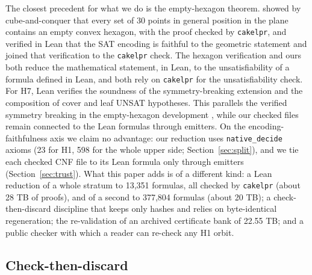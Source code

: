 \documentclass{anvil-paper}
\newcommand{\cakelpr}{\texttt{cake\textunderscore lpr}}
\theoremstyle{definition}
\begin{document}
The closest precedent for what we do is the empty-hexagon theorem. \citet{heule2024hexagon} showed by cube-and-conquer \citep{heule2011cube} that every set of 30 points in general position in the plane contains an empty convex hexagon, with the proof checked by \cakelpr{}, and \citet{subercaseaux2024hexagonlean} verified in Lean that the SAT encoding is faithful to the geometric statement and joined that verification to the \cakelpr{} check. The hexagon verification and ours both reduce the mathematical statement, in Lean, to the unsatisfiability of a formula defined in Lean, and both rely on \cakelpr{} for the unsatisfiability check. For H7, Lean verifies the soundness of the symmetry-breaking extension and the composition of cover and leaf UNSAT hypotheses. This parallels the verified symmetry breaking in the empty-hexagon development \citep{subercaseaux2024hexagonlean}, while our checked files remain connected to the Lean formulas through emitters. On the encoding-faithfulness axis we claim no advantage: our reduction uses \texttt{native\_decide} axioms (23 for H1, 598 for the whole upper side; Section~\ref{sec:split}), and we tie each checked CNF file to its Lean formula only through emitters (Section~\ref{sec:trust}). What this paper adds is of a different kind: a Lean reduction of a whole stratum to 13,351 formulas, all checked by \cakelpr{} (about 28 TB of proofs), and of a second to 377,804 formulas (about 20 TB); a check-then-discard discipline that keeps only hashes and relies on byte-identical regeneration; the re-validation of an archived certificate bank of 22.55 TB; and a public checker with which a reader can re-check any H1 orbit.

\subsection{Check-then-discard}\label{sec:method}
\end{document}
